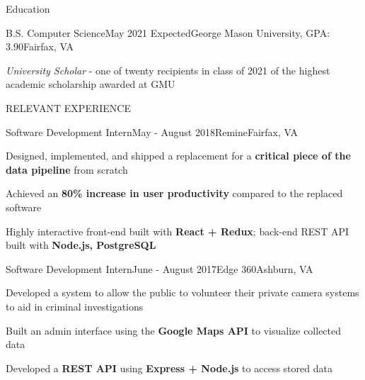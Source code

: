 \documentclass{resume} %
\begin{document}

\begin{rSection}{Education}
\begin{rSubsection}{B.S. Computer Science}{May 2021 Expected}{George Mason University, GPA: 3.90}{Fairfax, VA}

  \item \emph{University Scholar} - one of twenty recipients in class of 2021 of the highest academic scholarship awarded at GMU

\end{rSubsection}
\end{rSection}


\begin{rSection}{RELEVANT EXPERIENCE}

\begin{rSubsection}{Software Development Intern}{May - August 2018}{Remine}{Fairfax, VA} 

  \item Designed, implemented, and shipped a replacement for a \textbf{critical piece of the data pipeline} from scratch
  \item Achieved an \textbf{80\% increase in user productivity} compared to the replaced software
  \item Highly interactive front-end built with \textbf{React + Redux}; back-end REST API built with \textbf{Node.js, PostgreSQL}
  
\end{rSubsection}

\begin{rSubsection}{Software Development Intern}{June - August 2017}{Edge 360}{Ashburn, VA} 

  \item Developed a system to allow the public to volunteer their private camera systems to aid in criminal investigations
  \item Built an admin interface using the \textbf{Google Maps API} to visualize collected data
  \item Developed a \textbf{REST API} using \textbf{Express + Node.js} to access stored data
  
\end{rSubsection} 

\end{rSection}
\end{document}
